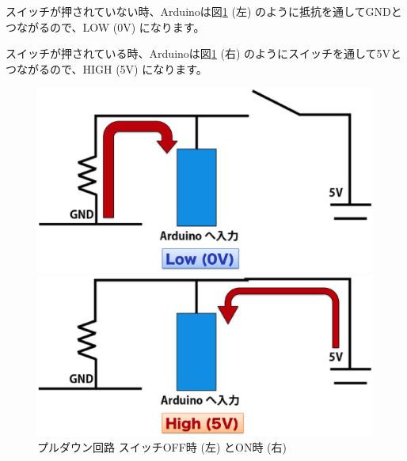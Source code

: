 \documentclass[11pt,a4paper]{jarticle}
\begin{document}
 スイッチが押されていない時、Arduinoは図\ref{fig:pulldown} (左) のように抵抗を通してGNDとつながるので、LOW (0V) になります。
 
 スイッチが押されている時、Arduinoは図\ref{fig:pulldown} (右) のようにスイッチを通して5Vとつながるので、HIGH (5V) になります。

 \begin{figure}[htbp]
  \begin{minipage}{0.5\columnwidth}
   \centering
   \includegraphics[width=0.9\columnwidth]{img/pulldown_off.eps}
  \end{minipage}
  \begin{minipage}{0.5\columnwidth}
   \includegraphics[width=0.9\columnwidth]{img/pulldown_on.eps}
  \end{minipage}
  \caption{プルダウン回路 スイッチOFF時 (左) とON時 (右)  }
  \label{fig:pulldown}
\end{figure}

\end{document}
